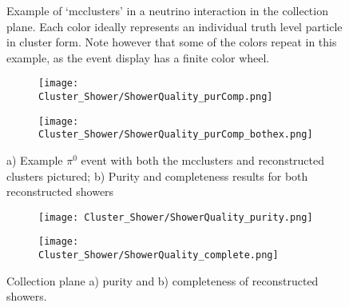 \begin{figure}[h!]
\centering
{}
\caption{ Example of `mcclusters' in a neutrino interaction in the collection plane. Each color ideally represents an individual truth level particle in cluster form. Note however that some of the colors repeat in this example, as the event display has a finite color wheel. }
\label{fig:mcclusters}
\end{figure}

\begin{figure}[H]
\centering
  \begin{subfigure}[t]{0.4\textwidth}
    \centering
\texttt{[image: Cluster\_Shower/ShowerQuality\_purComp.png]}
  \caption{ }
  \end{subfigure} 
  \hspace{5mm}
  \begin{subfigure}[t]{0.45\textwidth}
    \centering
\texttt{[image: Cluster\_Shower/ShowerQuality\_purComp\_bothex.png]}
  \caption{ }
  \end{subfigure} 
\caption{a) Example $\pi^0$ event with both the mcclusters and reconstructed clusters pictured; b) Purity and completeness results for both reconstructed showers }
\label{fig:showerquality_purcompex}
\end{figure}


\begin{figure}[H]
\centering
  \begin{subfigure}[t]{0.45\textwidth}
    \centering
\texttt{[image: Cluster\_Shower/ShowerQuality\_purity.png]}
  \caption{ }
  \end{subfigure} 
  \hspace{3mm}
  \begin{subfigure}[t]{0.45\textwidth}
    \centering
\texttt{[image: Cluster\_Shower/ShowerQuality\_complete.png]}
  \caption{ }
  \end{subfigure} 
\caption{Collection plane a) purity and b) completeness of reconstructed showers. }
\label{fig:showerquality_purcomp}
\end{figure}

